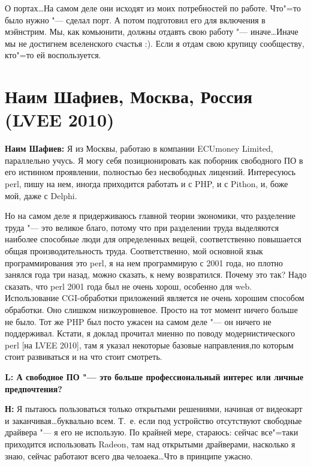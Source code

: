 \documentclass[10pt, a5paper]{article}
\begin{document}
О портах\ldots На самом деле они исходят из моих потребностей по работе. Что"=то было нужно "--- сделал порт. А потом подготовил его для включения в мэйнстрим. Мы, как комьюнити, должны отдавть свою работу "--- иначе\ldots Иначе мы не достигнем вселенского счастья :). Если я отдам свою крупицу сообществу, кто"=то ей воспользуется.

\section{Наим Шафиев, Москва, Россия (LVEE 2010)}


{\noindent \bf Наим Шафиев:} Я из Москвы, работаю в компании ECUmoney Limited, параллельно учусь. Я могу себя позиционировать как поборник свободного ПО в его истинном проявлении, полностью без несвободных лицензий. Интересуюсь perl, пишу на нем, иногда приходится работать и с PHP, и с Pithon, и, боже мой, даже с Delphi. 

Но на самом деле я придерживаюсь главной теории экономики, что разделение труда "--- это великое благо, потому что при разделении труда выделяются наиболее способные люди для определенных вещей, соответственно повышается общая производительность труда. Соответственно, мой основной язык программирования это perl, я на нем программирую с 2001 года, но плотно занялся года три назад, можно сказать, к нему возвратился. Почему это так? Надо сказать, что perl 2001 года был не очень хорош, особенно для web. Использование CGI-обработки приложений является не очень хорошим способом обработки. Оно слишком низкоуровневое. Просто на тот момент ничего больше не было. Тот же PHP был посто ужасен на самом деле "--- он ничего не поддерживал. Кстати, я доклад прочитал миенно по поводу модернистического perl [на LVEE 2010], там я указал некоторые базовые направления,по которым стоит развиваться и на что стоит смотреть.

{\noindent \bf L: А свободное ПО "--- это больше профессиональный интерес или личные предпочтения?}

{\noindent \bf Н:} Я пытаюсь пользоваться только открытыми решениями, начиная от видеокарт и заканчивая\ldots буквально всем. Т.~е. если под устройство отсутствуют свободные драйвера "--- я его не использую. По крайней мере, стараюсь: сейчас все"=таки приходится использовать Radeon, там над открытыми драйверами, насколько я знаю, сейчас работают всего два челоаека\ldots Что в принципе ужасно. 
\end{document}
